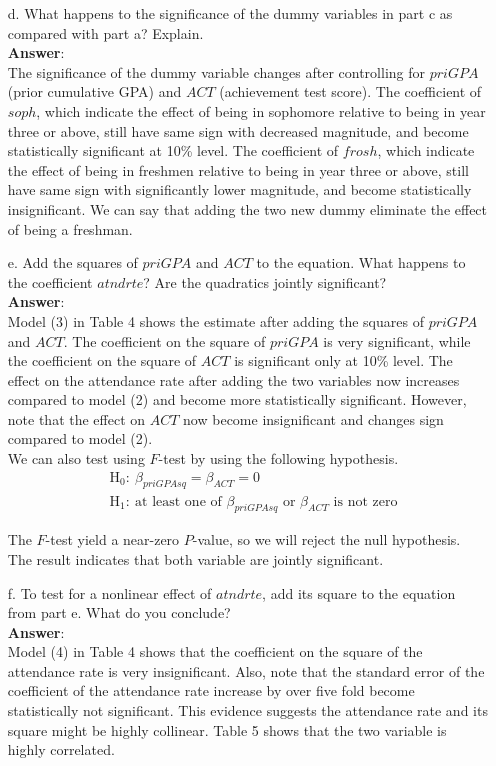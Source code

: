 \documentclass[10pt]{article}
\begin{document}
\begin{enumerate}
\item[d.] What happens to the significance of the dummy variables in part c as compared with part a? Explain.
\\ \textbf{Answer}:\\
The significance of the dummy variable changes after controlling for $priGPA$ (prior cumulative GPA) and $ACT$ (achievement test score). The coefficient of $soph$, which indicate the effect of being in sophomore relative to being in year three or above, still have same sign with decreased magnitude, and become statistically significant at 10\% level. The coefficient of $frosh$, which indicate the effect of being in freshmen relative to being in year three or above, still have same sign with significantly lower magnitude, and become statistically insignificant. We can say that adding the two new dummy eliminate the effect of being a freshman.

\item[e.] Add the squares of $priGPA$ and $ACT$ to the equation. What happens to the coefficient $atndrte$? Are the quadratics jointly significant?
\\ \textbf{Answer}:\\
Model (3) in Table 4 shows the estimate after adding the squares of $priGPA$ and $ACT$. The coefficient on the square of $priGPA$ is very significant, while the coefficient on the square of $ACT$ is significant only at 10\% level. The effect on the attendance rate after adding the two variables now increases compared to model (2) and become more statistically significant. However, note that the effect on $ACT$ now become insignificant and changes sign compared to model (2).\\
We can also test using $F$-test by using the following hypothesis.
\begin{align*}
    &\text{H}_0:\ \beta_{priGPAsq}=\beta_{ACT}=0\\
    &\text{H}_1:\ \text{at least one of }\beta_{priGPAsq}\text{ or }\beta_{ACT} \text{ is not zero}
\end{align*}

The $F$-test yield a near-zero $P$-value, so we will reject the null hypothesis. The result indicates that both variable are jointly significant.

\item[f.] To test for a nonlinear effect of $atndrte$, add its square to the equation from part e. What do you conclude? 
\\ \textbf{Answer}:\\
Model (4) in Table 4 shows that the coefficient on the square of the attendance rate is very insignificant. Also, note that the standard error of the coefficient of the attendance rate increase by over five fold become statistically not significant. This evidence suggests the attendance rate and its square might be highly collinear. Table 5 shows that the two variable is highly correlated.

\end{enumerate}
\end{document}
